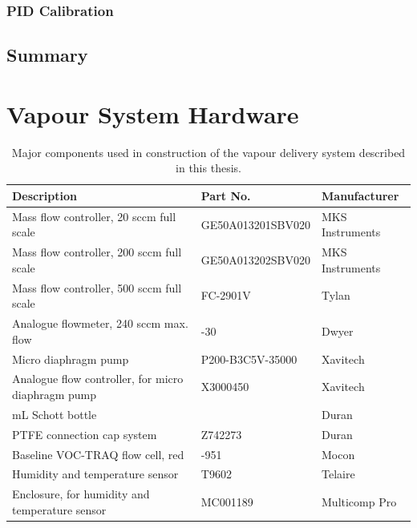 \documentclass[
  a4paper,
]{scrbook}
\begin{document}
\hypertarget{pid-calibration}{%
\subsection{PID Calibration}\label{pid-calibration}}

\hypertarget{summary}{%
\section{Summary}\label{summary}}

\cleardoublepage
{}
{}
\appendix

\hypertarget{sec-vapour-sensor-components}{%
\chapter{Vapour System Hardware}\label{sec-vapour-sensor-components}}

\hypertarget{tbl-vapour-sensor-components}{}
\begin{longtable}[t]{>{\raggedright\arraybackslash}p{5.5cm}>{\raggedright\arraybackslash}p{4.5cm}>{\raggedright\arraybackslash}p{3.75cm}}
\caption{\label{tbl-vapour-sensor-components}Major components used in construction of the vapour delivery system
described in this thesis. }\tabularnewline

\toprule
Description & Part No. & Manufacturer\\
\midrule
Mass flow controller, 20 sccm full scale & GE50A013201SBV020 & MKS Instruments\\
Mass flow controller, 200 sccm full scale & GE50A013202SBV020 & MKS Instruments\\
Mass flow controller, 500 sccm full scale & FC-2901V & Tylan\\
Analogue flowmeter, 240 sccm max. flow & 116261-30 & Dwyer\\
Micro diaphragm pump & P200-B3C5V-35000 & Xavitech\\
\addlinespace
Analogue flow controller, for micro diaphragm pump & X3000450 & Xavitech\\
10 mL Schott bottle & 218010802 & Duran\\
PTFE connection cap system & Z742273 & Duran\\
Baseline VOC-TRAQ flow cell, red & 043-951 & Mocon\\
Humidity and temperature sensor & T9602 & Telaire\\
\addlinespace
Enclosure, for humidity and temperature sensor & MC001189 & Multicomp Pro\\
\bottomrule
\end{longtable}
\end{document}
